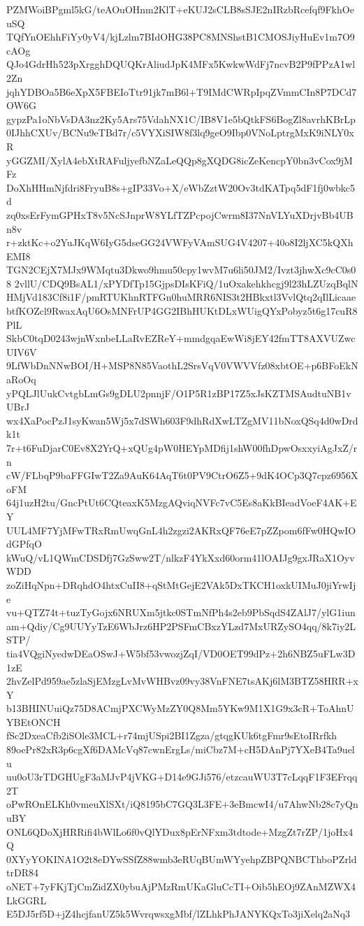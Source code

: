 PZMWoiBPgml5kG/teAOuOHnm2KlT+eKUJ2sCLB8sSJE2nIRzbRcefqf9FkhOeuSQ
TQfYnOEhhFiYy0yV4/kjLzlm7BIdOHG38PC8MNShstB1CMOSJiyHuEv1m7O9cAOg
QJo4GdrHh523pXrgghDQUQKrAliudJpK4MFx5KwkwWdFj7ncvB2P9fPPzA1wl2Zn
jqhYDBOa5B6eXpX5FBEIoTtr91jk7mB6l+T9IMdCWRpIpqZVmmCIn8P7DCd7OW6G
gypzPa1oNbVsDA3nz2Ky5Ars75VdahNX1C/IB8V1e5bQtkFS6BogZl8avrhKBrLp
0IJhhCXUv/BCNu9eTBd7r/c5VYXiSIW8f3lq9geO9Ibp0VNoLptrgMxK9iNLY0xR
yGGZMI/XylA4ebXtRAFuljyefbNZaLeQQp8gXQDG8icZeKencpY0bn3vCox9jMFz
DoXhHHmNjfdri8FryuB8s+gIP33Vo+X/eWbZztW20Ov3tdKATpq5dF1fj0wbkc5d
zq0xsErFymGPHxT8v5NcSJnprW8YLfTZPcpojCwrm8I37NnVLYuXDrjvBb4UBn8v
r+zktKc+o2YuJKqW6IyG5dseGG24VWFyVAmSUG4V4207+40o8I2ljXC5kQXhEMI8
TGN2CEjX7MJx9WMqtu3Dkwo9hmu50cpy1wvM7u6li50JM2/Ivzt3jhwXc9cC0s08
2vllU/CDQ9BsAL1/xPYDfTp15GjpsDIsKFiQ/1uOxakehkhcgj9l23hLZUzqBqlN
HMjVd183Cf8i1F/pmRTUKhnRTFGn0huMRR6NIS3t2HBkxtl3VvlQtq2qIlLicaae
btfKOZcl9RwaxAqU6OsMNFrUP4GG2IBhHUKtDLxWUigQYxPobyz5t6g17cuR8PlL
SkbC0tqD0243wjnWxnbeLLaRvEZReY+mmdgqaEwWi8jEY42fmTT8AXVUZwcUIV6V
9LfWbDnNNwBOI/H+MSP8N85VaothL2SrsVqV0VWVVfz08xbtOE+p6BFoEkNaRoOq
yPQLJlUukCvtgbLmGs9gDLU2pnnjF/O1P5R1zBP17Z5xJsKZTMSAudtuNB1vUBrJ
wx4XaPocPzJ1syKwan5Wj5x7dSWh603F9dhRdXwLTZgMV11bNoxQSq4d0wDrdk1t
7r+t6FuDjarC0Ev8X2YrQ+xQUg4pW0HEYpMDfij1shW00fhDpwOsxxyiAgJxZ/rn
cW/FLbqP9baFFGIwT2Za9AuK64AqT6t0PV9CtrO6Z5+9dK4OCp3Q7cpz6956XoFM
64j1uzH2tu/GncPtUt6CQteaxK5MzgAQviqNVFc7vC5Es8aKkBIeadVoeF4AK+EY
UUL4MF7YjMFwTRxRmUwqGnL4h2zgzi2AKRxQF76eE7pZZpom6fFw0HQwIOdGPfqO
kWuQ/vL1QWmCDSDfj7GzSww2T/nlkzF4YkXxd60orm41lOAIJg9gxJRaX1OyvWDD
zoZiHqNpn+DRqhdO4htxCuII8+qStMtGejE2VAk5DxTKCH1oxkUIMuJ0jiYrwIje
vu+QTZ74t+tuzTyGojx6NRUXm5jtkc0STmNfPh4s2eb9PbSqdS4ZAlJ7/ylG1iun
am+Qdiy/Cg9UUYyTzE6WbJrz6HP2PSFmCBxzYLzd7MxURZySO4qq/8k7iy2LSTP/
tia4VQgiNyedwDEaOSwJ+W5bf53vwozjZqI/VD0OET99dPz+2h6NBZ5uFLw3D1zE
2hvZelPd959ae5zlaSjEMzgLvMvWHBvz09vy38VnFNE7tsAKj6lM3BTZ58HRR+xY
b13BHINUuiQz75D8ACmjPXCWyMzZY0Q8Mm5YKw9M1X1G9x3cR+ToAhnUYBEtONCH
fSc2DxeaCfb2iSOle3MCL+r74mjUSpi2BI1Zgza/gtqgKUk6tgFmr9sEtoIRrfkh
89oePr82xR3p6cgXf6DAMcVq87cwnErgLs/miCbz7M+cH5DAnPj7YXeB4Ta9uelu
uu0oU3rTDGHUgF3aMJvP4jVKG+D14e9GJi576/etzcauWU3T7cLqqF1F3EFrqq2T
oPwROnELKh0vmeuXlSXt/iQ8195bC7GQ3L3FE+3eBmcwI4/u7AhwNb28c7yQnuBY
ONL6QDoXjHRRifi4bWlLo6f0vQlYDux8pErNFxm3tdtode+MzgZt7rZP/1joHx4Q
0XYyYOKINA1O2t8eDYwSSfZ88wmb3eRUqBUmWYyehpZBPQNBCThboPZrldtrDR84
oNET+7yFKjTjCmZidZX0ybuAjPMzRmUKaGluCcTI+Oib5hEOj9ZAnMZWX4LkGGRL
E5DJ5rf5D+jZ4hcjfanUZ5k5WvrqwsxgMbf/lZLhkPhJANYKQxTo3jiXelq2aNq3
